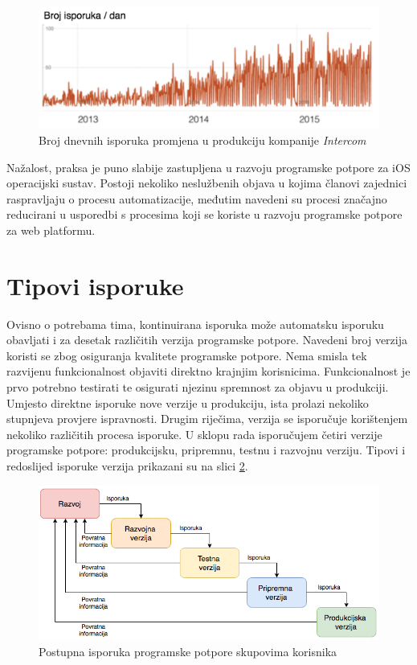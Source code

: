 \documentclass[times, utf8, diplomski, numeric]{fer}
\begin{document}
\begin{figure}
\centering
\includegraphics[scale=0.7]{IntercomShipsPerDay}
\caption{Broj dnevnih isporuka promjena u produkciju kompanije \textit{Intercom}}
\label{fig:IntercomShipsPerDay}
\end{figure}

Nažalost, praksa je puno slabije zastupljena u razvoju programske potpore za iOS operacijski sustav. Postoji nekoliko neslužbenih objava u kojima članovi zajednici raspravljaju o procesu automatizacije, međutim navedeni su procesi značajno reducirani u usporedbi s procesima koji se koriste u razvoju programske potpore za web platformu.

\section{Tipovi isporuke}

Ovisno o potrebama tima, kontinuirana isporuka može automatsku isporuku obavljati i za desetak različitih verzija programske potpore. Navedeni broj verzija koristi se zbog osiguranja kvalitete programske potpore. Nema smisla tek razvijenu funkcionalnost objaviti direktno krajnjim korisnicima. Funkcionalnost je prvo potrebno testirati te osigurati njezinu spremnost za objavu u produkciji. Umjesto direktne isporuke nove verzije u produkciju, ista prolazi nekoliko stupnjeva provjere ispravnosti. Drugim riječima, verzija se isporučuje korištenjem nekoliko različitih procesa isporuke. U sklopu rada isporučujem četiri verzije programske potpore: produkcijsku, pripremnu, testnu i razvojnu verziju. Tipovi i redoslijed isporuke verzija prikazani su na slici \ref{fig:DeploymentStages}.

\begin{figure}[h]
\centering
\includegraphics[scale=0.6]{DeploymentStages}
\caption{Postupna isporuka programske potpore skupovima korisnika}
\label{fig:DeploymentStages}
\end{figure}
\end{document}
